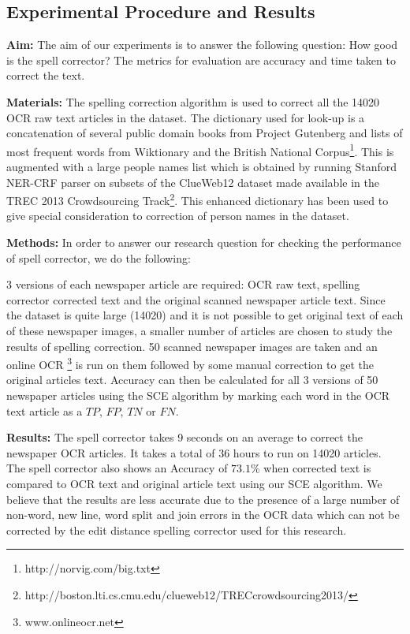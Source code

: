 \documentclass[12pt]{article}
\begin{document}
\subsection{Experimental Procedure and Results}

\noindent \textbf{Aim: }The aim of our experiments is to answer the following question:
How good is the spell corrector? The metrics for evaluation are accuracy and time taken to correct the text.


\noindent \textbf{Materials: }
The spelling correction algorithm is used to correct all the 14020 OCR raw text articles in the dataset. The dictionary used for look-up is a concatenation of several public domain books from Project Gutenberg and lists of most frequent words from Wiktionary and the British National Corpus\footnote{http://norvig.com/big.txt}. This is augmented with a large people names list which is obtained  by running Stanford NER-CRF parser on subsets of the ClueWeb12 dataset made available in the TREC 2013 Crowdsourcing Track\footnote{http://boston.lti.cs.cmu.edu/clueweb12/TRECcrowdsourcing2013/}. This enhanced dictionary has been used to give special consideration to correction of person names in the dataset.

\noindent \textbf{Methods: }
In order to answer our research question for checking the performance of spell corrector, we do the following: 

3 versions of each newspaper article are required: OCR raw text, spelling corrector corrected text and the original scanned newspaper article text. Since the dataset is quite large (14020) and it is not possible to get original text of each of these newspaper images, a smaller number of articles are chosen to study the results of spelling correction. 50 scanned newspaper images are taken and an online OCR \footnote{www.onlineocr.net} is run on them followed by some manual correction to get the original articles text. Accuracy can then be calculated for all 3 versions of 50 newspaper articles using the SCE algorithm by marking each word in the OCR text article as a $TP$, $FP$, $TN$ or $FN$. 

\noindent \textbf{Results: }
The spell corrector takes 9 seconds on an average to correct the newspaper OCR articles. It takes a total of 36 hours to run on 14020 articles.
The spell corrector also shows an Accuracy of $73.1 \%$  when corrected text is compared to OCR text and original article text using our SCE algorithm. We believe that the results are less accurate due to the presence of a large number of non-word, new line, word split and join errors in the OCR data which can not be corrected by the edit distance spelling corrector used for this research. 
\end{document}
